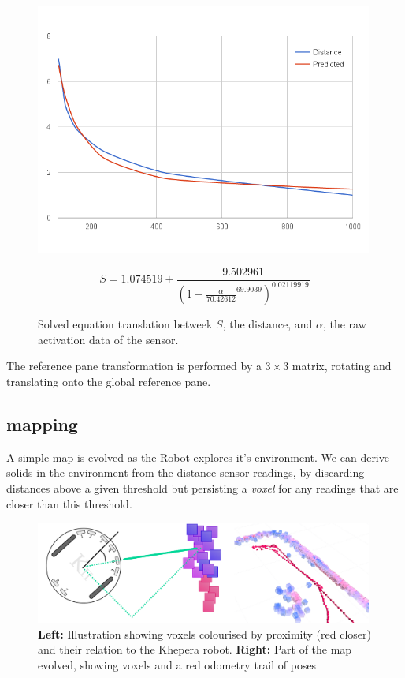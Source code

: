 \documentclass[11pt, a4paper]{article}
\begin{document}
\begin{figure}[h]
  \begin{center}
    \includegraphics[width=30em]{../assets/plots/sensor-equation.png}
  \end{center}
  \begin{equation}
    S = 1.074519 + 
    \frac{9.502961}
         {(1 + \frac{\alpha}{70.42612}^{69.9039})^{0.02119919}}
  \end{equation}
  \caption{Solved equation translation betweek $S$, the distance, and $\alpha$, 
    the raw activation data of the sensor.}
\end{figure}

The reference pane transformation is performed by a ${3\times3}$ matrix, rotating and translating
onto the global reference pane.

\subsection{mapping}

A simple map is evolved as the Robot explores it's environment. We can derive solids in the environment
from the distance sensor readings, by discarding distances above a given threshold but persisting a
\textit{voxel} for any readings that are closer than this threshold.

\begin{figure}[h]
  \begin{center}
    \includegraphics[width=30em]{../assets/khepera-wall.png}
  \end{center}
  \caption{\textbf{Left:} Illustration showing voxels colourised by proximity (red closer) and their
    relation to the Khepera robot. \textbf{Right:} Part of the map evolved, showing voxels and a
    red odometry trail of poses}
\end{figure}
\end{document}
